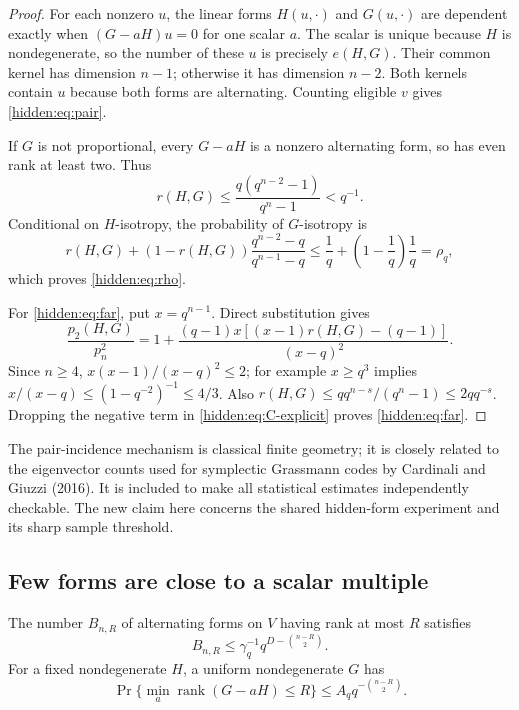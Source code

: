 \begin{proof}
For each nonzero $u$, the linear forms $H(u,\cdot)$ and $G(u,\cdot)$
are dependent exactly when $(G-aH)u=0$ for one scalar $a$.
The scalar is unique because $H$ is nondegenerate, so the number of these
$u$ is precisely $e(H,G)$. Their common kernel has dimension $n-1$;
otherwise it has dimension $n-2$. Both kernels contain $u$ because both
forms are alternating. Counting eligible $v$ gives \eqref{hidden:eq:pair}.

If $G$ is not proportional, every $G-aH$ is a nonzero alternating form,
so has even rank at least two. Thus
\[
 r(H,G)\le\frac{q(q^{n-2}-1)}{q^n-1}<q^{-1}.
\]
Conditional on $H$-isotropy, the probability of $G$-isotropy is
\[
 r(H,G)+(1-r(H,G))\frac{q^{n-2}-q}{q^{n-1}-q}
 \le\frac1q+\left(1-\frac1q\right)\frac1q=\rho_q,
\]
which proves \eqref{hidden:eq:rho}.

For \eqref{hidden:eq:far}, put $x=q^{n-1}$. Direct substitution gives
\begin{equation}\label{hidden:eq:C-explicit}
 \frac{p_2(H,G)}{p_n^2}
 =1+\frac{(q-1)x[(x-1)r(H,G)-(q-1)]}{(x-q)^2}.
\end{equation}
Since $n\ge4$, $x(x-1)/(x-q)^2\le2$; for example
$x\ge q^3$ implies $x/(x-q)\le(1-q^{-2})^{-1}\le4/3$.
Also
$r(H,G)\le q q^{n-s}/(q^n-1)\le2q q^{-s}$.
Dropping the negative term in \eqref{hidden:eq:C-explicit} proves
\eqref{hidden:eq:far}.
\end{proof}

The pair-incidence mechanism is classical finite geometry; it is closely
related to the eigenvector counts used for symplectic Grassmann codes by
Cardinali and Giuzzi (2016). It is included to make all statistical
estimates independently checkable. The new claim here concerns the
shared hidden-form experiment and its sharp sample threshold.

\subsection{Few forms are close to a scalar multiple}

\begin{lemma}\label{hidden:lem:rank}
The number $B_{n,R}$ of alternating forms on $V$ having rank at most $R$
satisfies
\begin{equation}\label{hidden:eq:rankcount}
 B_{n,R}\le\gamma_q^{-1}q^{D-\binom{n-R}{2}}.
\end{equation}
For a fixed nondegenerate $H$, a uniform nondegenerate $G$ has
\[
 \Pr\{\min_a\operatorname{rank}(G-aH)\le R\}
 \le A_q q^{-\binom{n-R}{2}}.
\]
\end{lemma}

